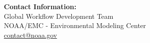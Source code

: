 \documentclass[11pt,letterpaper]{article}
\begin{document}
\vspace{1cm}
\begin{center}

\vspace{0.5cm}
\color{noaaNavy}
\textbf{Contact Information:} \\
Global Workflow Development Team \\
NOAA/EMC - Environmental Modeling Center \\
\href{mailto:contact@noaa.gov}{contact@noaa.gov}
\end{center}
\end{document}
